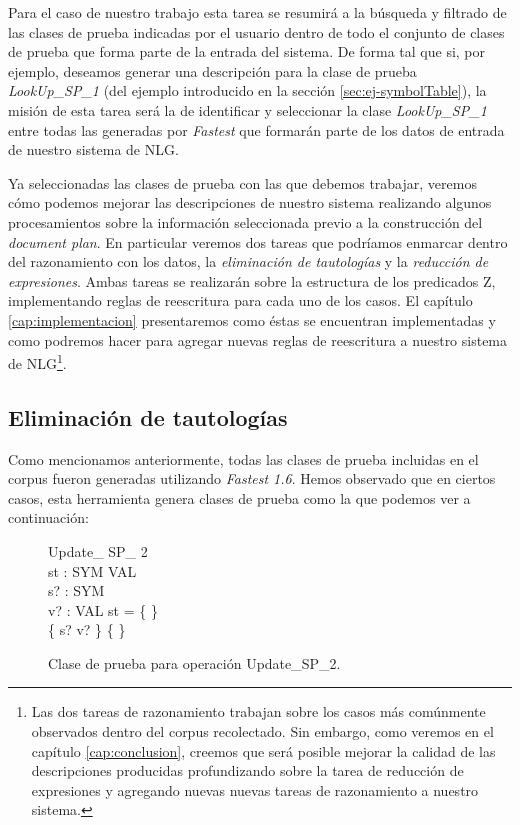 Para el caso de nuestro trabajo esta tarea se resumirá a la búsqueda y filtrado de las clases de prueba indicadas por el usuario dentro de todo el conjunto de clases de prueba que forma parte de la entrada del sistema. De forma tal que si, por ejemplo, deseamos generar una descripción para la clase de prueba \emph{LookUp\_SP\_1} (del ejemplo introducido en la sección \ref{sec:ej-symbolTable}), la misión de esta tarea será la de identificar y seleccionar la clase \emph{LookUp\_SP\_1} entre todas las generadas por \emph{Fastest} que formarán parte de los datos de entrada de nuestro sistema de NLG.


Ya seleccionadas las clases de prueba con las que debemos trabajar, veremos cómo podemos mejorar las descripciones de nuestro sistema realizando algunos procesamientos sobre la información seleccionada previo a la construcción del \textit{document plan}. En particular veremos dos tareas que podríamos enmarcar dentro del razonamiento con los datos, la \emph{eliminación de tautologías} y la \emph{reducción de expresiones}. Ambas tareas se realizarán sobre la estructura de los predicados Z, implementando reglas de reescritura para cada uno de los casos. El capítulo \ref{cap:implementacion} presentaremos como éstas se encuentran implementadas y como podremos hacer para agregar nuevas reglas de reescritura a nuestro sistema de NLG\footnote{Las dos tareas de razonamiento trabajan sobre los casos más comúnmente observados dentro del corpus recolectado. Sin embargo, como veremos en el capítulo \ref{cap:conclusion}, creemos que será posible mejorar la calidad de las descripciones producidas profundizando sobre la tarea de reducción de expresiones y agregando nuevas nuevas tareas de razonamiento a nuestro sistema.}.

\subsection*{Eliminación de tautologías}
Como mencionamos anteriormente, todas las clases de prueba incluidas en el corpus fueron generadas utilizando \emph{Fastest 1.6}. Hemos observado que en ciertos casos, esta herramienta genera clases de prueba como la que podemos ver a continuación:

\begin{figure}[H]
  \centering
\begin{schema}{Update\_ SP\_ 2}\\
 st : SYM \pfun VAL \\
 s? : SYM \\
 v? : VAL 
\where
 st = \{ \} \\
 \{ s? \mapsto v? \} \neq \{ \}
\end{schema}
  \caption{Clase de prueba para operación Update\_SP\_2.}
  \label{fig:ej_update_sp_2}
\end{figure}

